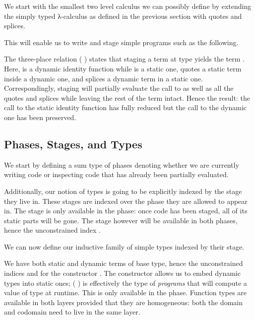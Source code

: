 \documentclass{article}
\begin{document}
We start with the smallest two level calculus we can possibly define
by extending the simply typed λ-calculus as defined in the previous
section with quotes and splices.

This will enable us to write and stage simple programs such as the following.


The three-place relation (    ) states
that staging a term  at type  yields the term .
%
Here,  is a dynamic identity function
while  is a static one,
 quotes a static term inside a dynamic one,
and  splices a dynamic term in a static one.
%
Correspondingly, staging will partially evaluate the call to
 as well as all the quotes and splices while leaving
the rest of the term intact.
%
Hence the result: the call to the static identity function has
fully reduced but the call to the dynamic one has been preserved.


\subsection{Phases, Stages, and Types}

We start by defining a sum type of phases denoting whether
we are currently writing  code or inspecting
 code that has already been partially evaluated.


Additionally, our notion of types is going to be explicitly
indexed by the stage they live in. These stages are indexed
over the phase they are allowed to appear in.
%
The  stage is only available in the 
phase: once code has been staged, all of its static parts will
be gone.
%
The  stage however will be available in both
phases, hence the unconstrained index .


We can now define our inductive family of simple types indexed
by their stage.


We have both static and dynamic terms of base type,
hence the unconstrained indices  and 
for the constructor .
%
The constructor  allows us to embed dynamic
types into static ones; ( ) is effectively
the type of \emph{programs} that will compute a value of
type  at runtime. This is only available in the
 phase.
%
Function types are available in both layers provided that
they are homogeneous: both the domain and codomain need
to live in the same layer.
\end{document}

